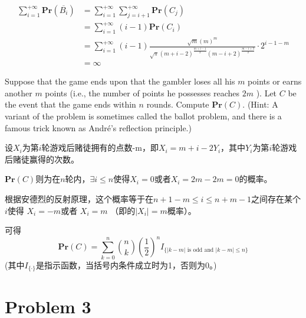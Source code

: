 \documentclass[12pt, a4paper, oneside]{ctexart}
\begin{document}
\begin{solution}
  $$
    \begin{aligned}
      \sum_{i=1}^{+\infty} \mathbf{Pr}(\overline{B_i}) & = \sum_{i=1}^{+\infty} \sum_{j=i+1}^{+\infty}\mathbf{Pr}(C_j)                                                                              \\
                                                       & =\sum_{i=1}^{+\infty} (i-1) \mathbf{Pr}(C_i)                                                                                               \\
                                                       & = \sum_{i=1}^{+\infty}(i-1)\frac{\sqrt{m}\left({m}\right)^m}{\sqrt{\pi}(m+i-2)^{\frac{m+i-1}{2}}(m-i+2)^{\frac{m-i+3}{2}}} \cdot 2^{i-1-m} \\
                                                       & = \infty
    \end{aligned}$$

\end{solution}
\begin{problem}
 Suppose that the game ends upon that the gambler loses all his $m$
points or earns another $m$
points (i.e., the number of points he possesses reaches $2m$
). Let $C$ be the event that the game ends within $n$
rounds. Compute $\displaystyle{ \mathbf{Pr}(C) }$. (Hint: A variant of the problem is sometimes called the ballot problem, and there is a famous trick known as André's reflection principle.)
\end{problem}

\begin{solution}


  设$X_i$为第$i$轮游戏后赌徒拥有的点数-m，即$X_i = m + i - 2Y_i$，其中$Y_i$为第$i$轮游戏后赌徒赢得的次数。

  $\mathbf{Pr}(C)$则为在$n$轮内，$\exists i \leq n$使得$X_i = 0$或者$X_i = 2m - 2m = 0$的概率。

  根据安德烈的反射原理，这个概率等于在$n+1-m \leq i \leq n+m-1 $之间存在某个$i $使得 $X_i = -m $或者 $X_i = m $ （即的$|X_i| = m $概率）。

  可得 $$\mathbf{Pr}(C) = \sum_{k=0}^{n} {n \choose k} (\frac{1}{2})^n I_{\{|k-m|\text{ is odd and } |k-m| \leq n\}}$$
  (其中$I_{\{\cdot\}}$是指示函数，当括号内条件成立时为1，否则为0。)


\end{solution}
\newpage
\section*{Problem 3}
\end{document}
